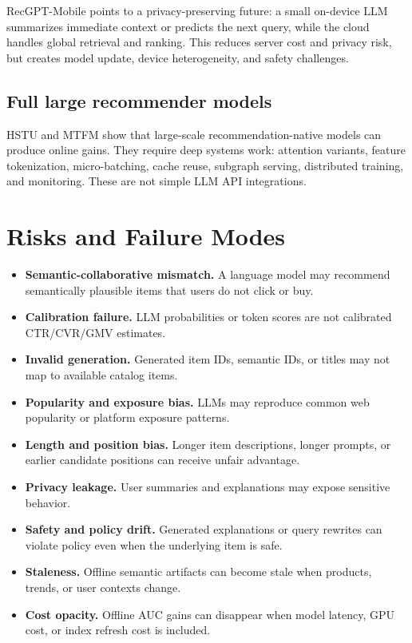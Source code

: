 \documentclass[11pt]{article}
\begin{document}
RecGPT-Mobile points to a privacy-preserving future: a small on-device LLM summarizes immediate context or predicts the next query, while the cloud handles global retrieval and ranking. This reduces server cost and privacy risk, but creates model update, device heterogeneity, and safety challenges.

\subsection{Full large recommender models}

HSTU and MTFM show that large-scale recommendation-native models can produce online gains. They require deep systems work: attention variants, feature tokenization, micro-batching, cache reuse, subgraph serving, distributed training, and monitoring. These are not simple LLM API integrations.

\section{Risks and Failure Modes}

\begin{itemize}
  \item \textbf{Semantic-collaborative mismatch.} A language model may recommend semantically plausible items that users do not click or buy.
  \item \textbf{Calibration failure.} LLM probabilities or token scores are not calibrated CTR/CVR/GMV estimates.
  \item \textbf{Invalid generation.} Generated item IDs, semantic IDs, or titles may not map to available catalog items.
  \item \textbf{Popularity and exposure bias.} LLMs may reproduce common web popularity or platform exposure patterns.
  \item \textbf{Length and position bias.} Longer item descriptions, longer prompts, or earlier candidate positions can receive unfair advantage.
  \item \textbf{Privacy leakage.} User summaries and explanations may expose sensitive behavior.
  \item \textbf{Safety and policy drift.} Generated explanations or query rewrites can violate policy even when the underlying item is safe.
  \item \textbf{Staleness.} Offline semantic artifacts can become stale when products, trends, or user contexts change.
  \item \textbf{Cost opacity.} Offline AUC gains can disappear when model latency, GPU cost, or index refresh cost is included.
\end{itemize}
\end{document}
